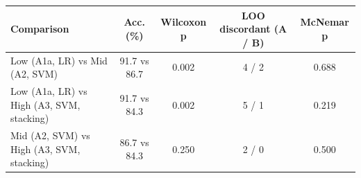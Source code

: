 \begin{tabular}{lcccc}
\toprule
\textbf{Comparison} & \textbf{Acc. (\%)} & \textbf{Wilcoxon p} & \textbf{LOO discordant (A / B)} & \textbf{McNemar p} \\
\midrule
Low (A1a, LR) vs Mid (A2, SVM) & 91.7 vs 86.7 & 0.002 & 4 / 2 & 0.688 \\
Low (A1a, LR) vs High (A3, SVM, stacking) & 91.7 vs 84.3 & 0.002 & 5 / 1 & 0.219 \\
Mid (A2, SVM) vs High (A3, SVM, stacking) & 86.7 vs 84.3 & 0.250 & 2 / 0 & 0.500 \\
\bottomrule
\end{tabular}
